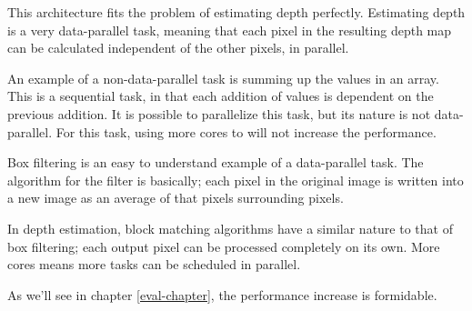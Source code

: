 This architecture fits the problem of estimating depth perfectly. Estimating
depth is a very data-parallel task, meaning that each pixel in the resulting
depth map can be calculated independent of the other pixels, in parallel.

An example of a non-data-parallel task is summing up the values in an array.
This is a sequential task, in that each addition of values is dependent on the
previous addition. It is possible to parallelize this task, but its nature is
not data-parallel. For this task, using more cores to will not increase the
performance.

Box filtering is an easy to understand example of a data-parallel task. The
algorithm for the filter is basically; each pixel in the original image is
written into a new image as an average of that pixels surrounding pixels.

In depth estimation, block matching algorithms have a similar nature to that
of box filtering; each output pixel can be processed completely on its own.
More cores means more tasks can be scheduled in parallel.

As we'll see in chapter \ref{eval-chapter}, the performance increase is
formidable.